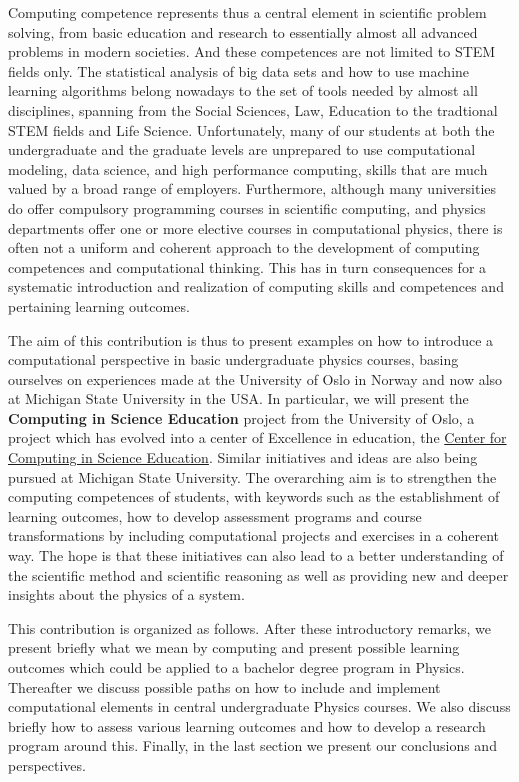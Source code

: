 \documentclass[graybox,envcountchap,sectrefs]{svmult}
\begin{document}
Computing competence represents thus a central element in scientific
problem solving, from basic education and research to essentially
almost all advanced problems in modern societies. And these
competences are not limited to STEM fields only. The statistical
analysis of big data sets and how to use machine learning algorithms
belong nowadays to the set of tools needed by almost all disciplines,
spanning from the Social Sciences, Law, Education to the tradtional
STEM fields and Life Science.  Unfortunately, many of our students at
both the undergraduate and the graduate levels are unprepared to use
computational modeling, data science, and high performance computing,
skills that are much valued by a broad range of employers.
Furthermore, although many universities do offer compulsory
programming courses in scientific computing, and physics departments
offer one or more elective courses in computational physics, there is
often not a uniform and coherent approach to the development of
computing competences and computational thinking. This has in turn
consequences for a systematic introduction and realization of
computing skills and competences and pertaining learning outcomes.

The aim of this contribution is thus to present examples on how to
introduce a computational perspective in basic undergraduate physics
courses, basing ourselves on experiences made at the University of
Oslo in Norway and now also at Michigan State University in the
USA. In particular, we will present the \textbf{Computing in Science
Education} project from the University of Oslo, a project which has
evolved into a center of Excellence in education, the \href{{http://www.mn.uio.no/ccse/english/}}{Center for
Computing in Science
Education}. Similar initiatives
and ideas are also being pursued at Michigan State University.  The
overarching aim is to strengthen the computing competences of
students, with keywords such as the establishment of learning
outcomes, how to develop assessment programs and course
transformations by including computational projects and exercises in a
coherent way. The hope is that these initiatives can also lead to a
better understanding of the scientific method and scientific reasoning
as well as providing new and deeper insights about the physics of a
system.

This contribution is organized as follows. After these introductory
remarks, we present briefly what we mean by computing and present
possible learning outcomes which could be applied to a bachelor degree
program in Physics.  Thereafter we discuss possible paths on how to include and implement 
computational elements in central undergraduate Physics courses. We also discuss briefly
how to assess various learning outcomes and how to develop a research program around this. 
Finally, in the last section we present our conclusions and perspectives.
\end{document}
